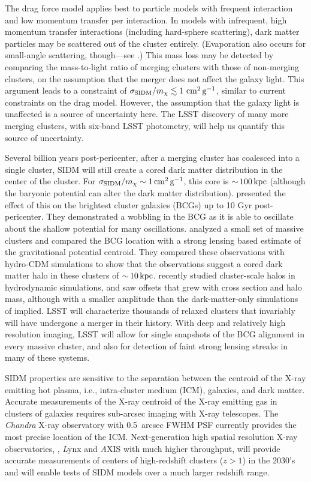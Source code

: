 The drag force model applies best to particle models with frequent interaction and low momentum transfer per interaction. In models with infrequent, high momentum transfer interactions (including hard-sphere scattering), dark matter particles may be scattered out of the cluster entirely. (Evaporation also occurs for small-angle scattering, though---see \citealt{Kahlhoefer:2013dca}.) This mass loss may be detected by comparing the mass-to-light ratio of merging clusters with those of non-merging clusters, on the assumption that the merger does not affect the galaxy light. This argument leads to a constraint of $\sigma_{\rm SIDM}/m_\chi \lesssim 1 \mathrm{\,\mathrm{\,cm}^2\mathrm{\,g}^{-1}}$, similar to current constraints on the drag model. However, the assumption that the galaxy light is unaffected is a source of uncertainty here. The LSST discovery of many more merging clusters, with six-band LSST photometry, will help us quantify this source of uncertainty. 

Several billion years post-pericenter, after a merging cluster has coalesced into a single cluster, SIDM will still create a cored dark matter distribution in the center of the cluster. For $\sigma_{\rm SIDM}/m_\chi \sim 1 \mathrm{\,cm}^{2} \mathrm{\,g}^{-1}$, this core is $ {\sim}\, 100 \mathrm{\,kpc}$ (although the baryonic potential can alter the dark matter distribution). \citet{Kim:2016ujt} presented the effect of this on the brightest cluster galaxies (BCGs) up to 10 Gyr post-pericenter. They demonstrated a wobbling in the BCG as it is able to oscillate about the shallow potential for many oscillations. \citet{1703.07365} analyzed a small set of massive clusters and compared the BCG location with a strong lensing based estimate of the gravitational potential centroid. They compared these observations with hydro-CDM simulations to show that the observations suggest a cored dark matter halo in these clusters of $ {\sim}\, 10\mathrm{\,kpc}$. \citet{Harvey:2018uwf} recently studied cluster-scale halos in hydrodynamic simulations, and saw offsets that grew with cross section and halo mass, although with a smaller amplitude than the dark-matter-only simulations of \citet{Kim:2016ujt} implied. LSST will characterize thousands of relaxed clusters that invariably will have undergone a merger in their history. With deep and relatively high resolution imaging, LSST will allow for single snapshots of the BCG alignment in every massive cluster, and also for detection of faint strong lensing streaks in many of these systems.

SIDM properties are sensitive to the separation between the centroid of the X-ray emitting hot plasma, i.e., intra-cluster medium (ICM), galaxies, and dark matter. Accurate measurements of the X-ray centroid of the X-ray emitting gas in clusters of galaxies requires sub-arcsec imaging with X-ray telescopes. The {\it Chandra} X-ray observatory with 0.5~arcsec FWHM PSF currently provides the most precise location of the ICM. Next-generation high spatial resolution X-ray observatories, \eg, {\textit Lynx} and {\textit AXIS} with much higher throughput, will provide accurate measurements of centers of high-redshift clusters ($z > 1$) in the 2030's and will enable tests of SIDM models over a much larger redshift range.
